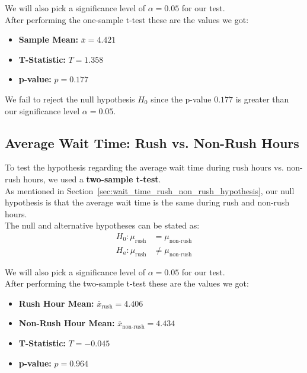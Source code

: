 \documentclass[a4paper, 10pt]{article}
\begin{document}
			\noindent We will also pick a significance level of \( \alpha = 0.05 \) for our test. \\

			After performing the one-sample t-test these are the values we got:
			\begin{itemize}
				\item \textbf{Sample Mean:} \( \bar{x} = 4.421 \)
				\item \textbf{T-Statistic:} \( T = 1.358 \)
				\item \textbf{p-value:} \( p = 0.177 \)
			\end{itemize}

			\noindent We fail to reject the null hypothesis $H_0$ since the p-value \( 0.177 \) is greater than our 
			significance level \( \alpha = 0.05 \). \\

		\subsection{Average Wait Time: Rush vs. Non-Rush Hours}
			\noindent To test the hypothesis regarding the average wait time during rush hours vs. non-rush hours, 
			we used a \textbf{two-sample t-test}. \\

			\noindent As mentioned in Section~\ref{sec:wait_time_rush_non_rush_hypothesis}, 
			our null hypothesis is that the average wait time is the same during rush and non-rush hours. \\

			\noindent The null and alternative hypotheses can be stated as:
			\begin{align*}
				H_0: \mu_{\text{rush}} &= \mu_{\text{non-rush}} \\
				H_a: \mu_{\text{rush}} &\neq \mu_{\text{non-rush}}
			\end{align*}

			\noindent We will also pick a significance level of \( \alpha = 0.05 \) for our test. \\

			After performing the two-sample t-test these are the values we got:
			\begin{itemize}
				\item \textbf{Rush Hour Mean:} \( \bar{x}_{\text{rush}} = 4.406 \)
				\item \textbf{Non-Rush Hour Mean:} \( \bar{x}_{\text{non-rush}} = 4.434 \)
				\item \textbf{T-Statistic:} \( T = -0.045 \)
				\item \textbf{p-value:} \( p = 0.964 \)
			\end{itemize}
\end{document}
